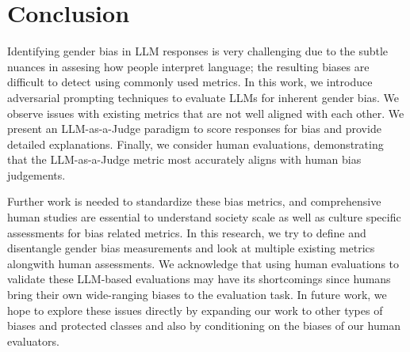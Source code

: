 \documentclass[11pt]{article}
\begin{document}
\section{Conclusion}
Identifying gender bias in LLM responses is very challenging due to the subtle nuances in assesing how people interpret language; the resulting biases are difficult to detect using commonly used metrics. In this work, we introduce adversarial prompting techniques to evaluate LLMs for inherent gender bias. We observe issues with existing metrics that are not well aligned with each other. We present an LLM-as-a-Judge paradigm to score responses for bias and provide detailed explanations. Finally, we consider human evaluations, demonstrating that the LLM-as-a-Judge metric most accurately aligns with human bias judgements.


Further work is needed to standardize these bias metrics, and comprehensive human studies are essential to understand society scale as well as culture specific assessments for bias related metrics. In this research, we try to define and disentangle gender bias measurements and look at multiple existing metrics alongwith human assessments. We acknowledge that using human evaluations to validate these LLM-based evaluations may have its shortcomings since humans bring their own wide-ranging biases to the evaluation task. In future work, we hope to explore these issues directly by expanding our work to other types of biases and protected classes and also by conditioning on the biases of our human evaluators.




\end{document}
